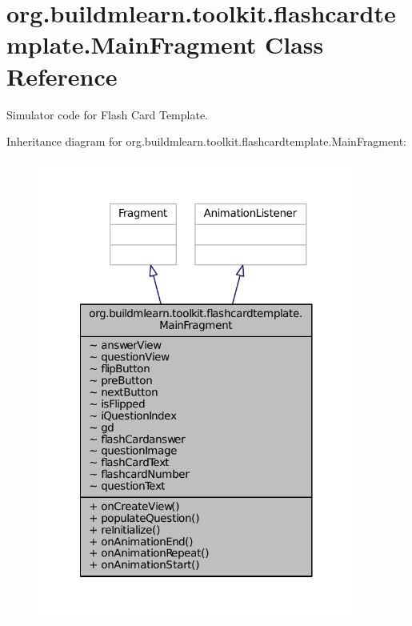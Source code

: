 \hypertarget{classorg_1_1buildmlearn_1_1toolkit_1_1flashcardtemplate_1_1MainFragment}{\section{org.\-buildmlearn.\-toolkit.\-flashcardtemplate.\-Main\-Fragment Class Reference}
\label{classorg_1_1buildmlearn_1_1toolkit_1_1flashcardtemplate_1_1MainFragment}
}


Simulator code for Flash Card Template.  




Inheritance diagram for org.\-buildmlearn.\-toolkit.\-flashcardtemplate.\-Main\-Fragment\-:
\nopagebreak
\begin{figure}[H]
\begin{center}
\leavevmode
\includegraphics[width=296pt]{d9/dfe/classorg_1_1buildmlearn_1_1toolkit_1_1flashcardtemplate_1_1MainFragment__inherit__graph}
\end{center}
\end{figure}


